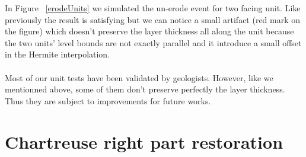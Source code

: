\documentclass[12pt, a4paper]{report} %
\begin{document}
In Figure ~\ref{erodeUnits} we simulated the un-erode event for two facing unit. Like previously the result is satisfying but we can notice a small artifact (red mark on the figure) which doesn't preserve the layer thickness all along the unit because the two units' level bounds are not exactly parallel and it introduce a small offset in the Hermite interpolation. \\\\
Most of our unit tests have been validated by geologists. However, like we mentionned above, some of them don't preserve perfectly the layer thickness. Thus they are subject to improvements for future works.
\section{Chartreuse right part restoration}
\end{document}
